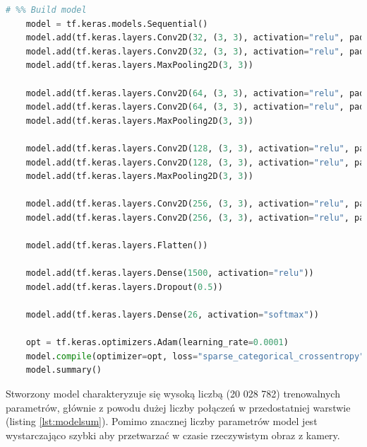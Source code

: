 \documentclass[a4paper,12pt,oneside]{book} %
\begin{document}
\begin{lstlisting}[language=Python, caption={Definicja modelu}, label={lst:model}]
	 # %% Build model
	model = tf.keras.models.Sequential()
	model.add(tf.keras.layers.Conv2D(32, (3, 3), activation="relu", padding="same", input_shape=(200, 200, 3)))
	model.add(tf.keras.layers.Conv2D(32, (3, 3), activation="relu", padding="same"))
	model.add(tf.keras.layers.MaxPooling2D(3, 3))
	
	model.add(tf.keras.layers.Conv2D(64, (3, 3), activation="relu", padding="same"))
	model.add(tf.keras.layers.Conv2D(64, (3, 3), activation="relu", padding="same"))
	model.add(tf.keras.layers.MaxPooling2D(3, 3))
	
	model.add(tf.keras.layers.Conv2D(128, (3, 3), activation="relu", padding="same"))
	model.add(tf.keras.layers.Conv2D(128, (3, 3), activation="relu", padding="same"))
	model.add(tf.keras.layers.MaxPooling2D(3, 3))
	
	model.add(tf.keras.layers.Conv2D(256, (3, 3), activation="relu", padding="same"))
	model.add(tf.keras.layers.Conv2D(256, (3, 3), activation="relu", padding="same"))
	
	model.add(tf.keras.layers.Flatten())
	
	model.add(tf.keras.layers.Dense(1500, activation="relu"))
	model.add(tf.keras.layers.Dropout(0.5))
	
	model.add(tf.keras.layers.Dense(26, activation="softmax"))
	
	opt = tf.keras.optimizers.Adam(learning_rate=0.0001)
	model.compile(optimizer=opt, loss="sparse_categorical_crossentropy", metrics=['accuracy'])
	model.summary()
\end{lstlisting}

Stworzony model charakteryzuje się wysoką liczbą (20 028 782) trenowalnych parametrów, głównie z powodu dużej liczby połączeń w przedostatniej warstwie (listing \ref{lst:modelsum}). Pomimo znacznej liczby parametrów model jest wystarczająco szybki aby przetwarzać w czasie rzeczywistym obraz z kamery.
\end{document}
